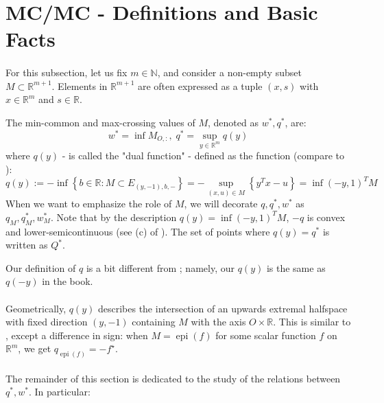 \section{MC/MC - Definitions and Basic Facts}
\label{sect:031}

\paragraph{}For this subsection, let us fix $m\in \mathbb{N}$, and consider a non-empty subset $M\subset \mathbb{R}^{m+1}$. Elements in $\mathbb{R}^{m+1}$ are often expressed as a tuple $(x,s)$ with $x\in \mathbb{R}^m$ and $s\in \mathbb{R}$.

\begin{defn}[MC/MC]\label{defn:031-mc-mc}
	The min-common and max-crossing values of $M$, denoted as $w^\ast,q^\ast$, are:
	\[
		w^\ast = \inf M_{O,:},\; q^\ast = \sup_{y\in \mathbb{R}^m} q(y)
	\]
	where $q(y)$ - is called the "dual function" - defined as the function (compare to ):
	\[
		q(y):= -\inf\left\{ b\in \mathbb{R}: M\subset E_{(y,-1),b,-} \right\} = - \sup_{(x,u)\in M}\left\{y^Tx-u\right\} = \inf (-y,1)^TM
	\]
	When we want to emphasize the role of $M$, we will decorate $q,q^\ast,w^\ast$ as $q_M,q^\ast_M,w^\ast_M$. Note that by the description $q(y) =\inf (-y,1)^TM$, $-q$ is convex and lower-semicontinuous (see (c) of ). The set of points where $q(y)=q^\ast$ is written as $Q^\ast$.
\end{defn}

\begin{rmrk}
	Our definition of $q$ is a bit different from \cite{bertsekas2009convex}; namely, our $q(y)$ is the same as $q(-y)$ in the book.
\end{rmrk}

\paragraph{}Geometrically, $q(y)$ describes the intersection of an upwards extremal halfspace with fixed direction $(y,-1)$ containing $M$ with the axis $O\times \mathbb{R}$. This is similar to , except a difference in sign: when $M=\operatorname{epi}(f)$ for some scalar function $f$ on $\mathbb{R}^m$, we get $q_{\operatorname{epi}(f)}=-f^\star$.

\paragraph{}The remainder of this section is dedicated to the study of the relations between $q^\ast,w^\ast$. In particular:

